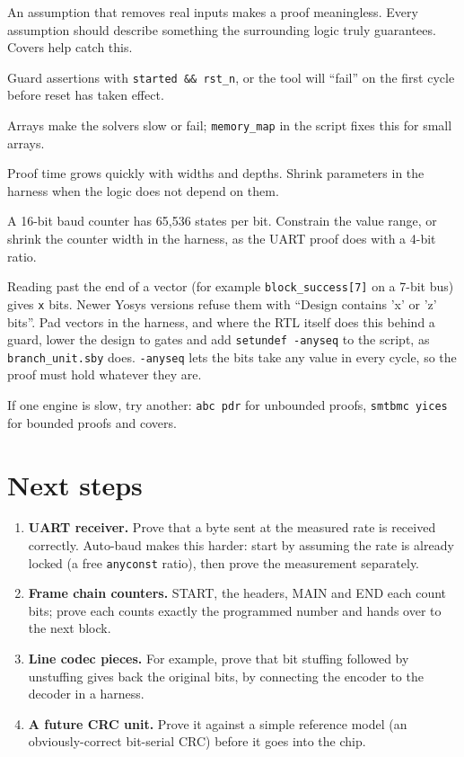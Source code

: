 \documentclass[11pt,a4paper]{article}
\newcommand{\file}[1]{\texttt{#1}}
\begin{document}
\begin{description}[style=nextline,leftmargin=1.5em]
\item[Too-strong assumptions] An assumption that removes real inputs makes a proof meaningless. Every assumption should describe something the surrounding logic truly guarantees. Covers help catch this.
\item[Checking during reset] Guard assertions with \texttt{started \&\& rst\_n}, or the tool will ``fail'' on the first cycle before reset has taken effect.
\item[Memories] Arrays make the solvers slow or fail; \texttt{memory\_map} in the script fixes this for small arrays.
\item[Large parameters] Proof time grows quickly with widths and depths. Shrink parameters in the harness when the logic does not depend on them.
\item[Long counters] A 16-bit baud counter has 65,536 states per bit. Constrain the value range, or shrink the counter width in the harness, as the UART proof does with a 4-bit ratio.
\item[Undefined bits] Reading past the end of a vector (for example \texttt{block\_success[7]} on a 7-bit bus) gives \texttt{x} bits. Newer Yosys versions refuse them with ``Design contains 'x' or 'z' bits''. Pad vectors in the harness, and where the RTL itself does this behind a guard, lower the design to gates and add \texttt{setundef -anyseq} to the script, as \file{branch\_unit.sby} does. \texttt{-anyseq} lets the bits take any value in every cycle, so the proof must hold whatever they are.
\item[Solver differences] If one engine is slow, try another: \texttt{abc pdr} for unbounded proofs, \texttt{smtbmc yices} for bounded proofs and covers.
\end{description}

\section{Next steps}

\begin{enumerate}
\item \textbf{UART receiver.} Prove that a byte sent at the measured rate is received correctly. Auto-baud makes this harder: start by assuming the rate is already locked (a free \texttt{anyconst} ratio), then prove the measurement separately.
\item \textbf{Frame chain counters.} START, the headers, MAIN and END each count bits; prove each counts exactly the programmed number and hands over to the next block.
\item \textbf{Line codec pieces.} For example, prove that bit stuffing followed by unstuffing gives back the original bits, by connecting the encoder to the decoder in a harness.
\item \textbf{A future CRC unit.} Prove it against a simple reference model (an obviously-correct bit-serial CRC) before it goes into the chip.
\end{enumerate}
\end{document}
